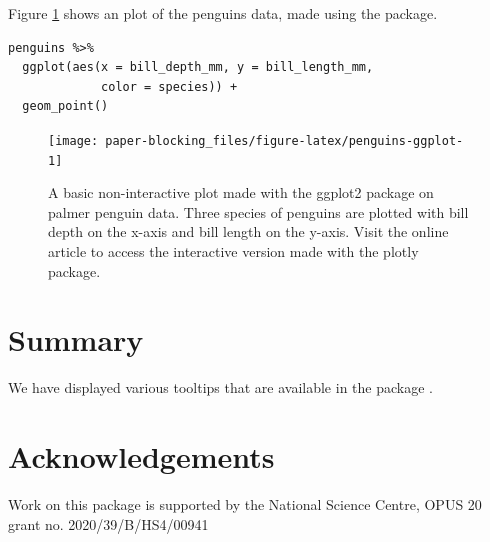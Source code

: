 Figure \ref{fig:penguins-ggplot} shows an plot of the penguins data, made using the  package.

\begin{verbatim}
penguins %>% 
  ggplot(aes(x = bill_depth_mm, y = bill_length_mm, 
             color = species)) + 
  geom_point()
\end{verbatim}

\begin{figure}
\texttt{[image: paper-blocking\_files/figure-latex/penguins-ggplot-1]} \caption{A basic non-interactive plot made with the ggplot2 package on palmer penguin data. Three species of penguins are plotted with bill depth on the x-axis and bill length on the y-axis. Visit the online article to access the interactive version made with the plotly package.}\label{fig:penguins-ggplot}
\end{figure}

\section{Summary}\label{summary}

We have displayed various tooltips that are available in the package .

\section{Acknowledgements}\label{acknowledgements}

Work on this package is supported by the National Science Centre, OPUS 20 grant no. 2020/39/B/HS4/00941



\address{%
Maciej Beręsewicz\\
University of Economics and BusinessStatisical Office in Poznań\\%
Department of Statistics, Poznań, Poland\\ Centre for the Methodology of Population Studies\\
%
\url{https://maciejberesewicz.com}\\%
\textit{ORCiD: \href{https://orcid.org/0000-0002-8281-4301}{0000-0002-8281-4301}}\\%
\href{mailto:maciej.beresewicz@poznan.pl}{\nolinkurl{maciej.beresewicz@poznan.pl}}%
}

\address{%
Adam Struzik\\
Adam Mickiewicz UniversityStatisical Office in Poznań\\%
Department of Mathematics, Poznań, Poland\\ Centre for Urban Statistics\\
%
%
%
\href{mailto:adastr5@st.amu.edu.pl}{\nolinkurl{adastr5@st.amu.edu.pl}}%
}
